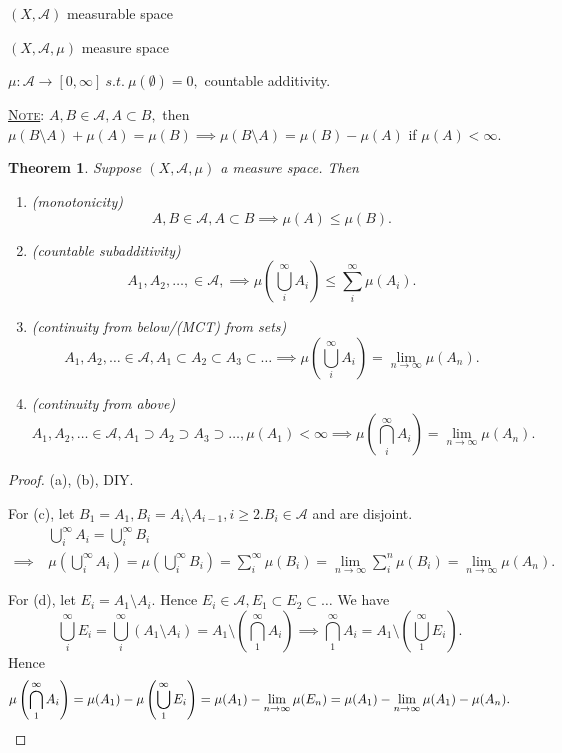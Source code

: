 \documentclass{report}
\newcommand{\st}{\ s.t.\ }
\newcommand{\fancyem}[1]{\underline{\textsc{#1}}}
\newtheorem{theorem}{Theorem}[chapter]
\theoremstyle{definition}
\theoremstyle{remark}
\begin{document}
$(X,  \mathcal{A})$ measurable space

$(X,  \mathcal{A}, \mu)$ measure space

$\mu: \mathcal{A} \to [0, \infty] \st \mu(\emptyset) = 0, $ countable additivity.

\fancyem{Note}: $A, B \in \mathcal{A}, A \subset B, $ then $ \mu(B \setminus A) + \mu(A) = \mu(B) \implies \mu(B \setminus A) = \mu(B) - \mu(A)$ if $\mu(A) < \infty.$

\setcounter{theorem}{12}
\begin{theorem}
Suppose $(X,  \mathcal{A}, \mu)$ a measure space. Then
\begin{enumerate}
\item(monotonicity)
\[A, B \in \mathcal{A}, A \subset B \implies \mu(A) \leq \mu(B).\]
\item(countable subadditivity)
	\[A_1, A_2, \ldots, \in \mathcal{A}, \implies \mu\left(\bigcup_i^\infty A_i\right) \leq \sum_i^\infty \mu(A_i).\]
\item(continuity from below/(MCT) from sets)
	\[A_1, A_2, \ldots \in \mathcal{A}, A_1 \subset A_2 \subset A_3 \subset \ldots \implies \mu\left(\bigcup_i^\infty A_i\right) = \lim_{n \to \infty} \mu(A_n).\]
\item(continuity from above)
	\[A_1, A_2, \ldots \in \mathcal{A}, A_1 \supset A_2 \supset A_3 \supset \ldots, \mu(A_1) < \infty \implies \mu\left(\bigcap_i^\infty A_i\right) = \lim_{n \to \infty} \mu(A_n).\]
\end{enumerate}
\end{theorem}
\begin{proof}
    (a), (b), DIY.

    For (c), let $B_1 = A_1, B_i = A_i \setminus A_{i-1}, i \geq 2. B_i \in \mathcal{A}$ and are disjoint.
    \begin{align*}
        & \bigcup_i^\infty A_i = \bigcup_i^\infty B_i \\
        \implies\ & \mu\left(\bigcup_i^\infty A_i\right) = \mu\left(\bigcup_i^\infty B_i\right) = \sum_{i}^\infty \mu(B_i) = \lim_{n \to \infty} \sum_{i}^n \mu(B_i) = \lim_{n \to \infty} \mu(A_n).
    \end{align*}


For (d), let $E_i = A_1 \setminus A_i.$ Hence $E_i \in \mathcal{A}, E_1 \subset E_2 \subset \ldots$
We have
\[
\bigcup_i^\infty E_i = \bigcup_i^\infty (A_1 \setminus A_i) = A_1 \setminus \left(\bigcap_1^\infty A_i\right) \implies \bigcap_1^\infty A_i = A_1 \setminus \left(\bigcup_1^\infty E_i\right).
\]
Hence
\[
\mu\left(\bigcap_1^\infty A_i \right) = \mu(A_1) - \mu\left(\bigcup_1^\infty E_i\right) = \mu(A_1) - \lim_{n\to \infty}\mu(E_n) = \mu(A_1) - \lim_{n\to \infty} \mu(A_1) - \mu(A_n). \qedhere
\]
\end{proof}
\end{document}
